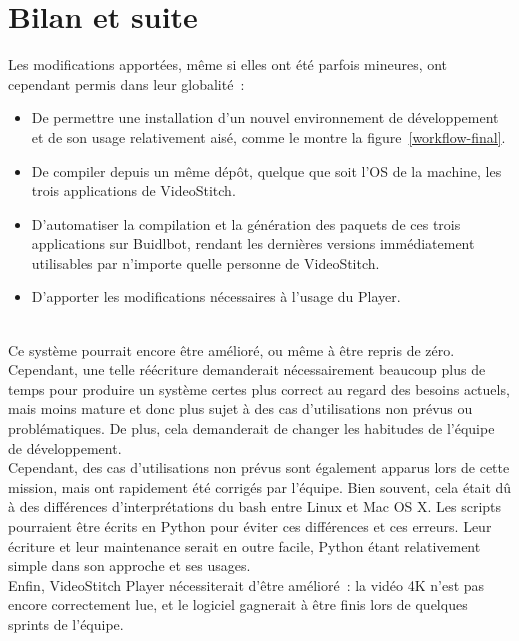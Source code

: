 \section{Bilan et suite}
Les modifications apportées, même si elles ont été parfois mineures, ont cependant permis dans leur globalité~:
\begin{itemize}
 \item De permettre une installation d'un nouvel environnement de développement et
 de son usage relativement aisé, comme le montre la figure~\ref{workflow-final}.
 \item De compiler depuis un même dépôt, quelque que soit l'OS de la machine, les trois applications de VideoStitch.
 \item D'automatiser la compilation et la génération des paquets de ces trois applications 
 sur Buidlbot, rendant les dernières versions immédiatement utilisables par n'importe 
 quelle personne de VideoStitch.
 \item D'apporter les modifications nécessaires à l'usage du Player.
\end{itemize}
\ \\
Ce système pourrait encore être amélioré, ou même à être repris de zéro. Cependant, 
une telle réécriture demanderait nécessairement beaucoup plus de temps pour
produire un système certes plus correct au regard des besoins actuels, mais moins mature
et donc plus sujet à des cas d'utilisations non prévus ou problématiques. De plus,
cela demanderait de changer les habitudes de l'équipe de développement.\\
Cependant, des cas d'utilisations non prévus sont également apparus lors de cette mission,
mais ont rapidement été corrigés par l'équipe. Bien souvent, cela était dû à des différences
d'interprétations du bash entre Linux et Mac OS X. Les scripts pourraient être écrits en Python pour
éviter ces différences et ces erreurs. Leur écriture et leur maintenance serait 
en outre facile, Python étant relativement simple dans son approche et ses usages.\\
Enfin, VideoStitch Player nécessiterait d'être amélioré~: la vidéo
4K n'est pas encore correctement lue, et le logiciel gagnerait à être finis lors
de quelques sprints de l'équipe.
